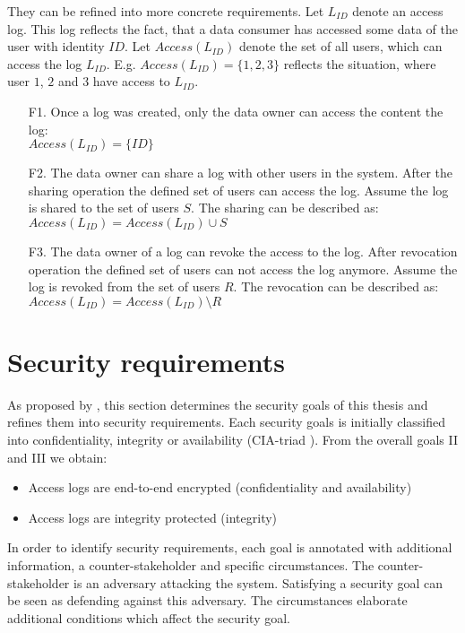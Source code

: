 \documentclass[../main.tex]{subfiles}
\begin{document}
They can be refined into more concrete requirements. 
Let $L_{ID}$ denote an access log. 
This log reflects the fact, that a data consumer has accessed some data of the user with identity $ID$.
Let $Access(L_{ID})$ denote the set of all users, which can access the log $L_{ID}$.
E.g. $Access(L_{ID}) =\{1,2,3\}$ reflects the situation, where user $1$, $2$ and $3$ have access to $L_{ID}$.
\begin{enumerate}
    \item [F1.] Once a log was created, only the data owner can access the content the log:
    \\$Access(L_{ID}) =\{ID\}$
    \item [F2.] The data owner can share a log with other users in the system. 
    After the sharing operation the defined set of users can access the log.
    Assume the log is shared to the set of users $S$. 
    The sharing can be described as: 
    \\$Access(L_{ID}) = Access(L_{ID}) \cup S$
    \item [F3.] The data owner of a log can revoke the access to the log.
    After revocation operation the defined set of users can not access the log anymore.
    Assume the log is revoked from the set of users $R$. 
    The revocation can be described as: 
    \\$Access(L_{ID}) = Access(L_{ID}) \setminus R$

\end{enumerate}

\section{Security requirements}\label{security-requriements}
As proposed by \citeauthor{Fabian2010}, this section determines the security goals of this thesis and refines them into security requirements.
Each security goals is initially classified into confidentiality, integrity or availability (CIA-triad ). 
From the overall goals II and III we obtain:
\begin{itemize}
    \item Access logs are end-to-end encrypted (confidentiality and availability)
    \item Access logs are integrity protected (integrity)
\end{itemize}

In order to identify security requirements, each goal is annotated with additional information, a counter-stakeholder and specific circumstances.
The counter-stakeholder is an adversary attacking the system.
Satisfying a security goal can be seen as defending against this adversary.
The circumstances elaborate additional conditions which affect the security goal.
\end{document}
